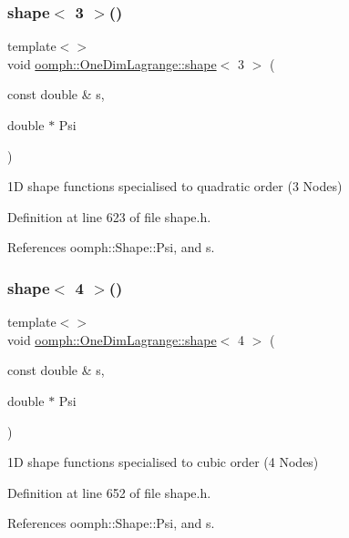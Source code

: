 \mbox{\label{namespaceoomph_1_1OneDimLagrange_acccbf08730b769433dd95c7c564fa28a}} 
\subsubsection{\texorpdfstring{shape$<$ 3 $>$()}{shape< 3 >()}}
{\footnotesize\ttfamily template$<$$>$ \\
void \hyperlink{namespaceoomph_1_1OneDimLagrange_a117f8b892dc89989ecdad99ff261e120}{oomph\+::\+One\+Dim\+Lagrange\+::shape}$<$ 3 $>$ (\begin{DoxyParamCaption}\item[{const double \&}]{s,  }\item[{double $\ast$}]{Psi }\end{DoxyParamCaption})\hspace{0.3cm}{\ttfamily [inline]}}



1D shape functions specialised to quadratic order (3 Nodes) 



Definition at line 623 of file shape.\+h.



References oomph\+::\+Shape\+::\+Psi, and s.

\mbox{\label{namespaceoomph_1_1OneDimLagrange_aead7e479371c7eb764b8f4ad68986ade}} 
\subsubsection{\texorpdfstring{shape$<$ 4 $>$()}{shape< 4 >()}}
{\footnotesize\ttfamily template$<$$>$ \\
void \hyperlink{namespaceoomph_1_1OneDimLagrange_a117f8b892dc89989ecdad99ff261e120}{oomph\+::\+One\+Dim\+Lagrange\+::shape}$<$ 4 $>$ (\begin{DoxyParamCaption}\item[{const double \&}]{s,  }\item[{double $\ast$}]{Psi }\end{DoxyParamCaption})\hspace{0.3cm}{\ttfamily [inline]}}



1D shape functions specialised to cubic order (4 Nodes) 



Definition at line 652 of file shape.\+h.



References oomph\+::\+Shape\+::\+Psi, and s.

